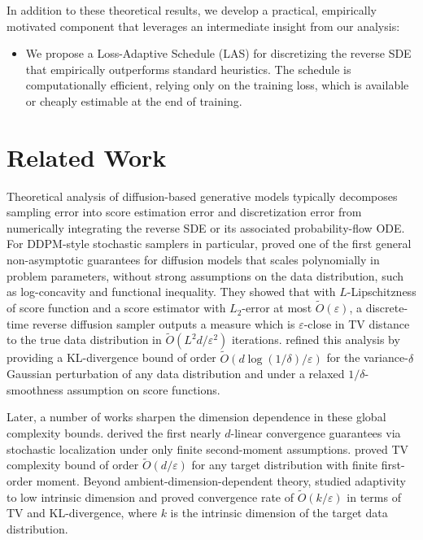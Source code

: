 \documentclass[11pt]{article}
\theoremstyle{definition}
\numberwithin{equation}{section}
\begin{document}
In addition to these theoretical results, we develop a practical, empirically motivated component that leverages an intermediate insight from our analysis:
\begin{itemize}
    \item We propose a Loss-Adaptive Schedule (LAS) for discretizing the reverse SDE that empirically outperforms standard heuristics. The schedule is computationally efficient, relying only on the training loss, which is available or cheaply estimable at the end of training.
\end{itemize}


\section{Related Work}
Theoretical analysis of diffusion-based generative models typically decomposes sampling error into score estimation error and discretization error from numerically integrating the reverse SDE or its associated probability-flow ODE. 
For DDPM-style stochastic samplers \cite{ho2020denoising} in particular, \cite{chen2023sampling} proved one of the first general non-asymptotic guarantees for diffusion models that scales polynomially in problem parameters, without strong assumptions on the data distribution, such as log-concavity and functional inequality. They showed that with $L$-Lipschitzness of score function and a score estimator with $L_2$-error at most $\tilde O(\varepsilon)$, a discrete-time reverse diffusion sampler outputs a measure which is $\varepsilon$-close in TV distance to the true data distribution in $\tilde O(L^2 d/\varepsilon^2)$ iterations. 
\cite{chen2023improved} refined this analysis by providing a KL-divergence bound of order $\tilde O (d\log(1/\delta)/\varepsilon)$ for the variance-$\delta$ Gaussian perturbation of any data distribution and under a relaxed $1/\delta$-smoothness assumption on score functions. 

Later, a number of works sharpen the dimension dependence in these global complexity bounds.
\cite{benton2024nearly} derived the first nearly $d$-linear convergence guarantees via stochastic localization under only finite second-moment assumptions. \cite{li2025odt} proved TV complexity bound of order $\tilde O (d/\varepsilon)$ for any target distribution with finite first-order moment.
Beyond ambient-dimension-dependent theory, \cite{li2025odt,liang2025low,pmlr-v291-potaptchik25a} studied adaptivity to low intrinsic dimension and proved convergence rate of $\tilde O(k/\varepsilon)$ in terms of TV and KL-divergence, where $k$ is the intrinsic dimension of the target data distribution. 
\end{document}
